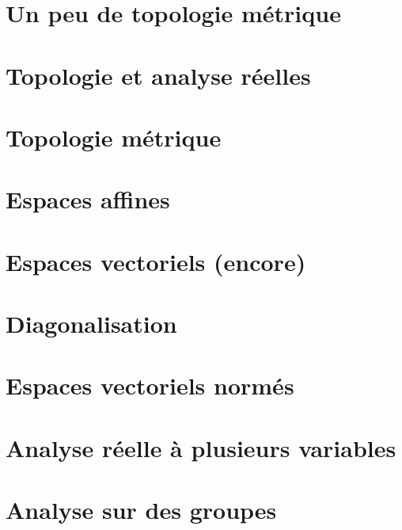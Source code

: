 \documentclass[a4paper,twoside,11pt]{book}
\begin{document}
\chapter{Un peu de topologie métrique}



\chapter{Topologie et analyse réelles}



\chapter{Topologie métrique}



\chapter{Espaces affines}


\chapter{Espaces vectoriels (encore)}



\chapter{Diagonalisation}






\chapter{Espaces vectoriels normés}




\chapter{Analyse réelle à plusieurs variables}






\chapter{Analyse sur des groupes}

\end{document}
